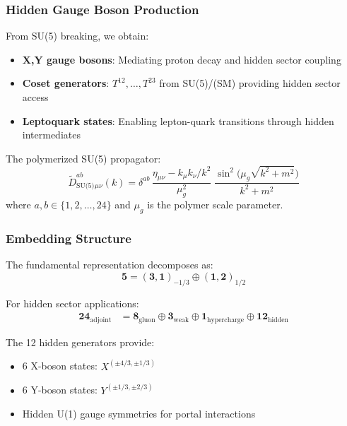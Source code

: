 \documentclass[11pt]{article}
\begin{document}
\subsubsection{Hidden Gauge Boson Production}

From SU(5) breaking, we obtain:
\begin{itemize}
    \item \textbf{X,Y gauge bosons}: Mediating proton decay and hidden sector coupling
    \item \textbf{Coset generators}: $T^{12}, \ldots, T^{23}$ from SU(5)/(SM) providing hidden sector access
    \item \textbf{Leptoquark states}: Enabling lepton-quark transitions through hidden intermediates
\end{itemize}

The polymerized SU(5) propagator:
\begin{equation}
\boxed{
\widetilde{D}_{\text{SU(5)}}^{ab}{}_{\mu\nu}(k) = \delta^{ab}\,\frac{\eta_{\mu\nu}-k_\mu k_\nu/k^2}{\mu_g^2} \;\frac{\sin^2\!\bigl(\mu_g\sqrt{k^2 + m^2}\bigr)}{k^2 + m^2}
}
\end{equation}
where $a,b \in \{1,2,\ldots,24\}$ and $\mu_g$ is the polymer scale parameter.

\subsubsection{Embedding Structure}

The fundamental representation decomposes as:
\begin{equation}
\mathbf{5} = (\mathbf{3}, \mathbf{1})_{-1/3} \oplus (\mathbf{1}, \mathbf{2})_{1/2}
\end{equation}

For hidden sector applications:
\begin{align}
\mathbf{24}_{\text{adjoint}} &= \mathbf{8}_{\text{gluon}} \oplus \mathbf{3}_{\text{weak}} \oplus \mathbf{1}_{\text{hypercharge}} \oplus \mathbf{12}_{\text{hidden}}
\end{align}

The 12 hidden generators provide:
\begin{itemize}
    \item 6 X-boson states: $X^{(\pm 4/3, \pm 1/3)}$
    \item 6 Y-boson states: $Y^{(\pm 1/3, \pm 2/3)}$ 
    \item Hidden U(1) gauge symmetries for portal interactions
\end{itemize}
\end{document}
